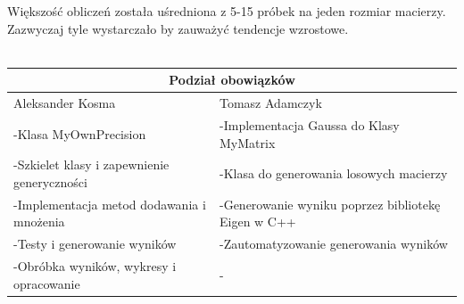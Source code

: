 \documentclass[8pt]{article}
\begin{document}
Większość obliczeń została uśredniona z 5-15 próbek na jeden rozmiar macierzy. Zazwyczaj tyle wystarczało by zauważyć tendencje wzrostowe.\\
\\
\begin{tabular}{ | p{8.2cm} | p{8.2cm} | }
  \hline
  \multicolumn{2}{|c|}{Podział obowiązków} \\
  \hline
  Aleksander Kosma & Tomasz Adamczyk \\
  \hline
  -Klasa MyOwnPrecision & -Implementacja  Gaussa do Klasy MyMatrix \\\hline
  -Szkielet klasy i zapewnienie generyczności & -Klasa do generowania losowych macierzy \\\hline
  -Implementacja metod dodawania i mnożenia & -Generowanie wyniku poprzez bibliotekę Eigen w C++ \\\hline
  -Testy i generowanie wyników & -Zautomatyzowanie generowania wyników \\\hline
  -Obróbka wyników, wykresy i opracowanie & - \\\hline
  
  \hline
\end{tabular}
\end{document}
